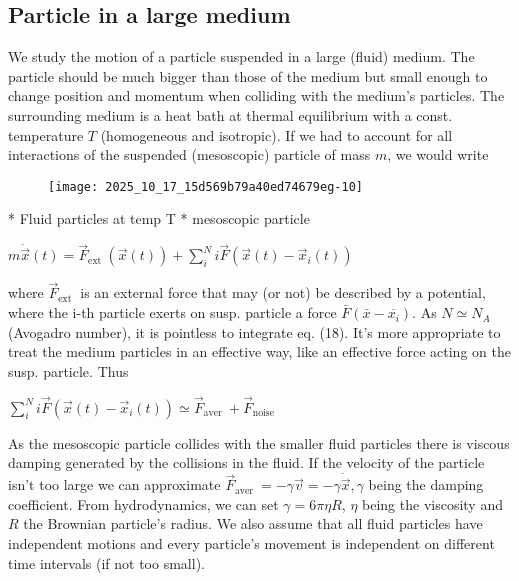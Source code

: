 \subsection*{Particle in a large medium}
We study the motion of a particle suspended in a large (fluid) medium. The particle should be much bigger than those of the medium but small enough to change position and momentum when colliding with the medium's particles. The surrounding medium is a heat bath at thermal equilibrium with a const. temperature $T$ (homogeneous and isotropic).
If we had to account for all interactions of the suspended (mesoscopic) particle of mass $m$, we would write
\begin{figure}[H]
    \centering
    \texttt{[image: 2025\_10\_17\_15d569b79a40ed74679eg-10]}
\end{figure}
    * Fluid particles at temp T
    * mesoscopic particle
\begin{DispWithArrows}[tag=18]
    $m \ddot{\vec{x}}(t)=\vec{F}_{\text {ext }}(\vec{x}(t))+\sum_{i}^{N} i \vec{F}\left(\vec{x}(t)-\vec{x}_{i}(t)\right)$
\end{DispWithArrows}
where $\vec{F}_{\text {ext }}$ is an external force that may (or not) be described by a potential, where the i-th particle exerts on susp. particle a force $\bar{F}\left(\bar{x}-\overline{x_{i}}\right)$. As $N \simeq N_{A}$ (Avogadro number), it is pointless to integrate eq. (18). It's more appropriate to treat the medium particles in an effective way, like an effective force acting on the susp. particle. Thus
\begin{DispWithArrows}
    $\sum_{i}^{N} i \vec{F}\left(\vec{x}(t)-\vec{x}_{i}(t)\right) \simeq \vec{F}_{\text {aver }}+\vec{F}_{\text {noise }}$
\end{DispWithArrows}
As the mesoscopic particle collides with the smaller fluid particles there is viscous damping generated by the collisions in the fluid. If the velocity of the particle isn't too large we can approximate $\vec{F}_{\text {aver }}=-\gamma \vec{v}=-\gamma \dot{\vec{x}}, \gamma$ being the damping coefficient. From hydrodynamics, we can set $\gamma=6 \pi \eta R$, $\eta$ being the viscosity and $R$ the Brownian particle's radius.
We also assume that all fluid particles have independent motions and every particle's movement is independent on different time intervals (if not too small).

